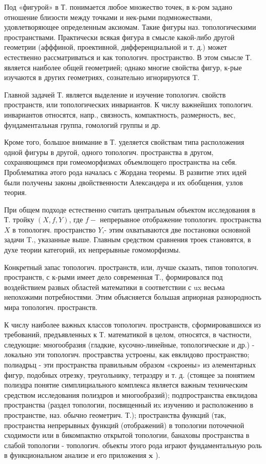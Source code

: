 \documentclass[10pt]{article}
\begin{document}
Под «фигурой» в Т. понимается любое множество точек, в к-ром задано отношение близости между точками и нек-рыми подмножествами, удовлетворяющее определенным аксиомам. Такие фигуры наз. топологическими пространствами. Практически всякая фигура в смысле какой-либо другой геометрии (афффиной, проективной, дифференциальной и т. д.) может естественно рассматриваться и как топологич. пространство. В этом смысле Т. является наиболее общей геометрией; однако многие свойства фигур, к-рые изучаются в других геометриях, сознательно игнорируются T.



Главной задачей Т. является выделение и изучение топологич. свойств пространств, или топологических инвариантов. К числу важнейших топологич. инвариантов относятся, напр., связность, компактность, размерность, вес, фундаментальная группа, гомологий группы и др.



Кроме того, большое внимание в Т. уделяется свойствам типа расположения одной фигуры в другой, одного топологич. пространства в другом, сохраняющимся при гомеоморфизмах объемлющего пространства на себя. Проблематика әтого рода началась с Жордана теоремы. В развитие этих идей были получены законы двойственности Александера и их обобщения, узлов теория.



При общем подходе естественно считать центральным объектом исследования в Т. тройку $(X, f, Y)$, где $f-$ непрерывное отображение топологич. пространства $X$ в топологич. пространство $Y$,- этим охватываются две постановки основной задачи T., указанные выше. Главным средством сравнения троек становятся, в духе теории категорий, их непрерывные гомоморфизмы.



Конкретный запас топологич. пространств, или, лучше сказать, типов топологич. пространств, с к-рыми имеет дело современная Т., формировался под воздействием развых областей математики в соответствии с ux весьма непохожими потребностями. Этим объясняется большая априорная разнородность мира топологич. пространств.



К числу наиболее важных классов топологич. пространств, сформировавшихся из требований, предъявленных к Т. математикой в целом, относятся, в частности, следующие: многообразия (гладкие, кусочно-линейные, топологические и др.) - локально эти топологич. простравства устроены, как евклидово пространство; полиәдрьц - эти пространства правильным образом «скроены» из әлементарных фигур, подобных отрезку, треугольнику, тетраэдру и т. д. (стоящее за понятием полиэдра понятие симплициального комплекса является важным техническим средством исследования полиэдров и многообразий); подпространства евклидова пространства (раздел топологии, посвященный иx изучению и расположению в пространстве, наз. обычно геометрич. Т.); пространства функций (так, пространства непрерывных функций (отображений) в топологии поточечной сходимости или в бикомпактно открытой топологии, банаховы пространства в слабой топологии - топологич. объекты этого рода играют фундаментальную роль в функциональном анализе и его приложения $\mathbf{x}$ ).
\end{document}
